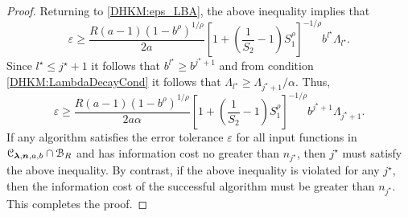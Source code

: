 \documentclass[USenglish]{article}
\theoremstyle{dgthm}
\theoremstyle{dgthm}
\theoremstyle{dgthm}
\theoremstyle{dgthm}
\theoremstyle{dgdef}
\theoremstyle{definition}
\begin{document}
\begin{proof}
Returning to \eqref{DHKM:eps_LBA}, the above inequality  implies that
\begin{equation*}
    \varepsilon 
\ge  \frac{R(a-1)(1 - b^\rho)^{1/\rho}}{2a} \left[1 + \left(\frac 1 {S_2} -1 \right) S_1^\rho \right]^{-1/\rho} b^{l^\star} \Lambda_{l^\star}.
\end{equation*}
Since $l^\star \le j^{\star}+1$ it follows that $ b^{l^\star} \ge b^{j^\star+1}$ and from condition \eqref{DHKM:LambdaDecayCond} it follows that $\Lambda_{l^\star} \ge \Lambda_{j^\star+1}/\alpha$.  Thus,
\begin{equation*}
    \varepsilon 
\ge  \frac{R(a-1)(1 - b^\rho)^{1/\rho}}{2a\alpha} \left[1 + \left(\frac 1 {S_2} -1 \right) S_1^\rho \right]^{-1/\rho} b^{j^\star+1} \Lambda_{j^\star+1}.
\end{equation*}
If any algorithm satisfies the error tolerance $\varepsilon$ for all input functions in ${\mathcal{C}}_{\boldsymbol{\lambda},{\boldsymbol{n}},a,b} \cap {\mathcal{B}}_R$ and has information cost no greater than $n_{j^\star}$, then $j^\star$ must satisfy the above inequality.  By contrast, if the above inequality is violated for any $j^\star$, then the information cost of the successful algorithm must be greater than $n_{j^\star}$.  This completes the proof.
\end{proof}
\end{document}
